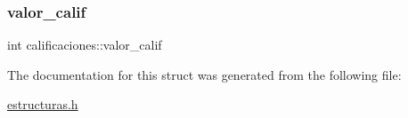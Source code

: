 \mbox{\label{structcalificaciones_af79ae6ed55e0fc1bfd9746b78b75fa6c}} 
\subsubsection{\texorpdfstring{valor\+\_\+calif}{valor\_calif}}
{\footnotesize\ttfamily int calificaciones\+::valor\+\_\+calif}



The documentation for this struct was generated from the following file\+:\begin{DoxyCompactItemize}
\item 
\mbox{\hyperlink{estructuras_8h}{estructuras.\+h}}\end{DoxyCompactItemize}
